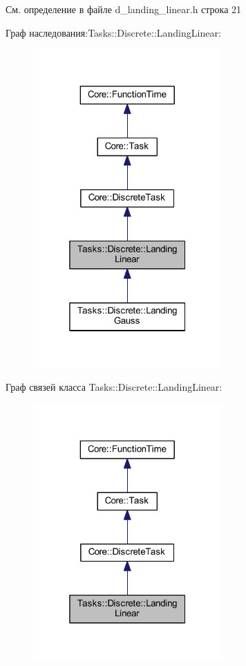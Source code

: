 См. определение в файле d\+\_\+landing\+\_\+linear.\+h строка 21



Граф наследования\+:Tasks\+:\+:Discrete\+:\+:Landing\+Linear\+:
\nopagebreak
\begin{figure}[H]
\begin{center}
\leavevmode
\includegraphics[width=205pt]{class_tasks_1_1_discrete_1_1_landing_linear__inherit__graph}
\end{center}
\end{figure}


Граф связей класса Tasks\+:\+:Discrete\+:\+:Landing\+Linear\+:
\nopagebreak
\begin{figure}[H]
\begin{center}
\leavevmode
\includegraphics[width=205pt]{class_tasks_1_1_discrete_1_1_landing_linear__coll__graph}
\end{center}
\end{figure}


